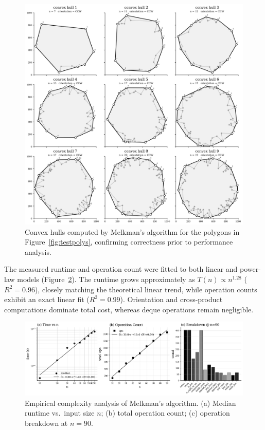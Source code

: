 \documentclass{article}
\begin{document}
\begin{figure}[H]
    \centering
    \includegraphics[width=0.95\linewidth]{Pictures/test_hulls.png}
    \caption{Convex hulls computed by Melkman’s algorithm for the polygons in Figure~\ref{fig:testpolys}, confirming correctness prior to performance analysis.}
    \label{fig:testhulls}
\end{figure}

The measured runtime and operation count were fitted to both linear and power-law models (Figure~\ref{fig:complexity}).  
The runtime grows approximately as \(T(n)\!\propto\!n^{1.28}\) (\(R^2=0.96\)), closely matching the theoretical linear trend, while operation counts exhibit an exact linear fit (\(R^2=0.99\)).  
Orientation and cross-product computations dominate total cost, whereas deque operations remain negligible.

\begin{figure}[H]
    \centering
    \includegraphics[width=0.95\linewidth]{Pictures/melkman_complexity.png}
    \caption{Empirical complexity analysis of Melkman’s algorithm.  
    (a) Median runtime vs.~input size $n$;  
    (b) total operation count;  
    (c) operation breakdown at $n=90$.}
    \label{fig:complexity}
\end{figure}
\end{document}

